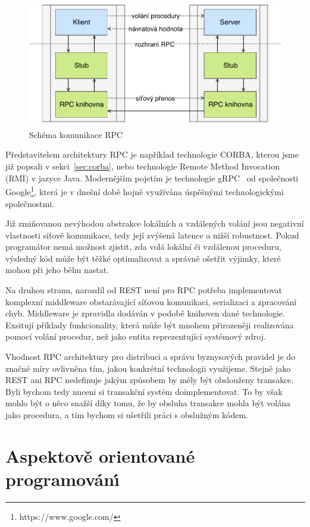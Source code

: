 \begin{figure}[t]
    \centering
    \includegraphics[keepaspectratio=true, width=0.7\linewidth]{figures/rpc.pdf}
    \caption{Schéma komunikace \gls{RPC}}
    \label{fig:rpc}
\end{figure}

Představitelem architektury \gls{RPC} je například technologie \gls{CORBA},
kterou jsme již popsali v sekci~\ref{sec:corba}, nebo technologie Remote Method Invocation (\gls{RMI})
v jazyce Java. Modernějším pojetím je technologie gRPC~\cite{grpcio}
od společnosti Google\footnote{https://www.google.com/},
která je v dnešní době hojně využívána úspěšnými technologickými společnostmi.

Již zmiňovanou nevýhodou abstrakce lokálních a vzdálených volání jsou
negativní vlastnosti síťové komunikace, tedy její zvýšená latence
a nižší robustnost. Pokud programátor nemá možnost zjistit, zda volá
lokální či vzdálenou proceduru, výsledný kód může být těžké optimalizovat
a správně ošetřit výjimky, které mohou při jeho běhu nastat.

Na druhou stranu, narozdíl od \gls{REST} není pro \gls{RPC} potřeba
implementovat komplexní middleware obstarávající síťovou komunikaci,
serializaci a zpracování chyb. Middleware je zpravidla dodáván v podobě knihoven
dané technologie. Exsitují příklady funkcionality, která může být mnohem přirozeněji
realizována pomocí volání procedur, než jako entita reprezentující systémový zdroj.

Vhodnost \gls{RPC} architektury pro distribuci a správu byznysových pravidel je do značné
míry ovlivněna tím, jakou konkrétní technologii využijeme. Stejně jako \gls{REST}
ani \gls{RPC} nedefinuje jakým způsobem by měly být obslouženy transakce. Byli bychom tedy
nuceni si transakční systém doimplementovat. To by však mohlo být o něco snažší díky tomu,
že by obsluha transakce mohla být volána jako procedura, a tím bychom si ušetřili práci
s obslužným kódem.

\section{Aspektově orientované programován\'{\i}}\label{sec:aop}

